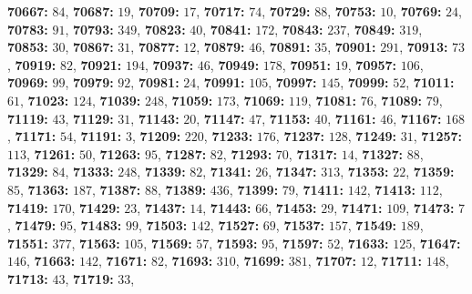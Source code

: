 \textsf{\bfseries 70667:} $84$, \textsf{\bfseries 70687:} $19$, \textsf{\bfseries 70709:} $17$, \textsf{\bfseries 70717:} $74$, \textsf{\bfseries 70729:} $88$, \textsf{\bfseries 70753:} $10$, \textsf{\bfseries 70769:} $24$, \textsf{\bfseries 70783:} $91$, \textsf{\bfseries 70793:} $349$, \textsf{\bfseries 70823:} $40$, \textsf{\bfseries 70841:} $172$, \textsf{\bfseries 70843:} $237$, \textsf{\bfseries 70849:} $319$, \textsf{\bfseries 70853:} $30$, \textsf{\bfseries 70867:} $31$, \textsf{\bfseries 70877:} $12$, \textsf{\bfseries 70879:} $46$, \textsf{\bfseries 70891:} $35$, \textsf{\bfseries 70901:} $291$, \textsf{\bfseries 70913:} $73$, \textsf{\bfseries 70919:} $82$, \textsf{\bfseries 70921:} $194$, \textsf{\bfseries 70937:} $46$, \textsf{\bfseries 70949:} $178$, \textsf{\bfseries 70951:} $19$, \textsf{\bfseries 70957:} $106$, \textsf{\bfseries 70969:} $99$, \textsf{\bfseries 70979:} $92$, \textsf{\bfseries 70981:} $24$, \textsf{\bfseries 70991:} $105$, \textsf{\bfseries 70997:} $145$, \textsf{\bfseries 70999:} $52$, \textsf{\bfseries 71011:} $61$, \textsf{\bfseries 71023:} $124$, \textsf{\bfseries 71039:} $248$, \textsf{\bfseries 71059:} $173$, \textsf{\bfseries 71069:} $119$, \textsf{\bfseries 71081:} $76$, \textsf{\bfseries 71089:} $79$, \textsf{\bfseries 71119:} $43$, \textsf{\bfseries 71129:} $31$, \textsf{\bfseries 71143:} $20$, \textsf{\bfseries 71147:} $47$, \textsf{\bfseries 71153:} $40$, \textsf{\bfseries 71161:} $46$, \textsf{\bfseries 71167:} $168$, \textsf{\bfseries 71171:} $54$, \textsf{\bfseries 71191:} $3$, \textsf{\bfseries 71209:} $220$, \textsf{\bfseries 71233:} $176$, \textsf{\bfseries 71237:} $128$, \textsf{\bfseries 71249:} $31$, \textsf{\bfseries 71257:} $113$, \textsf{\bfseries 71261:} $50$, \textsf{\bfseries 71263:} $95$, \textsf{\bfseries 71287:} $82$, \textsf{\bfseries 71293:} $70$, \textsf{\bfseries 71317:} $14$, \textsf{\bfseries 71327:} $88$, \textsf{\bfseries 71329:} $84$, \textsf{\bfseries 71333:} $248$, \textsf{\bfseries 71339:} $82$, \textsf{\bfseries 71341:} $26$, \textsf{\bfseries 71347:} $313$, \textsf{\bfseries 71353:} $22$, \textsf{\bfseries 71359:} $85$, \textsf{\bfseries 71363:} $187$, \textsf{\bfseries 71387:} $88$, \textsf{\bfseries 71389:} $436$, \textsf{\bfseries 71399:} $79$, \textsf{\bfseries 71411:} $142$, \textsf{\bfseries 71413:} $112$, \textsf{\bfseries 71419:} $170$, \textsf{\bfseries 71429:} $23$, \textsf{\bfseries 71437:} $14$, \textsf{\bfseries 71443:} $66$, \textsf{\bfseries 71453:} $29$, \textsf{\bfseries 71471:} $109$, \textsf{\bfseries 71473:} $7$, \textsf{\bfseries 71479:} $95$, \textsf{\bfseries 71483:} $99$, \textsf{\bfseries 71503:} $142$, \textsf{\bfseries 71527:} $69$, \textsf{\bfseries 71537:} $157$, \textsf{\bfseries 71549:} $189$, \textsf{\bfseries 71551:} $377$, \textsf{\bfseries 71563:} $105$, \textsf{\bfseries 71569:} $57$, \textsf{\bfseries 71593:} $95$, \textsf{\bfseries 71597:} $52$, \textsf{\bfseries 71633:} $125$, \textsf{\bfseries 71647:} $146$, \textsf{\bfseries 71663:} $142$, \textsf{\bfseries 71671:} $82$, \textsf{\bfseries 71693:} $310$, \textsf{\bfseries 71699:} $381$, \textsf{\bfseries 71707:} $12$, \textsf{\bfseries 71711:} $148$, \textsf{\bfseries 71713:} $43$, \textsf{\bfseries 71719:} $33$, 
